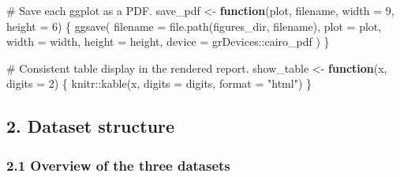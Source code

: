 \documentclass[
  letterpaper,
  DIV=11,
  numbers=noendperiod]{scrartcl}
\newenvironment{Shaded}{\begin{snugshade}}{\end{snugshade}}
\newcommand{\AttributeTok}[1]{\textcolor[rgb]{0.40,0.45,0.13}{#1}}
\newcommand{\CommentTok}[1]{\textcolor[rgb]{0.37,0.37,0.37}{#1}}
\newcommand{\ControlFlowTok}[1]{\textcolor[rgb]{0.00,0.23,0.31}{\textbf{#1}}}
\newcommand{\DecValTok}[1]{\textcolor[rgb]{0.68,0.00,0.00}{#1}}
\newcommand{\FunctionTok}[1]{\textcolor[rgb]{0.28,0.35,0.67}{#1}}
\newcommand{\NormalTok}[1]{\textcolor[rgb]{0.00,0.23,0.31}{#1}}
\newcommand{\OtherTok}[1]{\textcolor[rgb]{0.00,0.23,0.31}{#1}}
\newcommand{\SpecialCharTok}[1]{\textcolor[rgb]{0.37,0.37,0.37}{#1}}
\newcommand{\StringTok}[1]{\textcolor[rgb]{0.13,0.47,0.30}{#1}}
\begin{document}
\begin{Shaded}
\begin{Highlighting}[]
\CommentTok{\# Save each ggplot as a PDF.}
\NormalTok{save\_pdf }\OtherTok{\textless{}{-}} \ControlFlowTok{function}\NormalTok{(plot, filename, }\AttributeTok{width =} \DecValTok{9}\NormalTok{, }\AttributeTok{height =} \DecValTok{6}\NormalTok{) \{}
  \FunctionTok{ggsave}\NormalTok{(}
    \AttributeTok{filename =} \FunctionTok{file.path}\NormalTok{(figures\_dir, filename),}
    \AttributeTok{plot =}\NormalTok{ plot,}
    \AttributeTok{width =}\NormalTok{ width,}
    \AttributeTok{height =}\NormalTok{ height,}
    \AttributeTok{device =}\NormalTok{ grDevices}\SpecialCharTok{::}\NormalTok{cairo\_pdf}
\NormalTok{  )}
\NormalTok{\}}

\CommentTok{\# Consistent table display in the rendered report.}
\NormalTok{show\_table }\OtherTok{\textless{}{-}} \ControlFlowTok{function}\NormalTok{(x, }\AttributeTok{digits =} \DecValTok{2}\NormalTok{) \{}
\NormalTok{  knitr}\SpecialCharTok{::}\FunctionTok{kable}\NormalTok{(x, }\AttributeTok{digits =}\NormalTok{ digits, }\AttributeTok{format =} \StringTok{"html"}\NormalTok{)}
\NormalTok{\}}
\end{Highlighting}
\end{Shaded}

\subsection{2. Dataset structure}\label{dataset-structure}

\subsubsection{2.1 Overview of the three
datasets}\label{overview-of-the-three-datasets}
\end{document}
